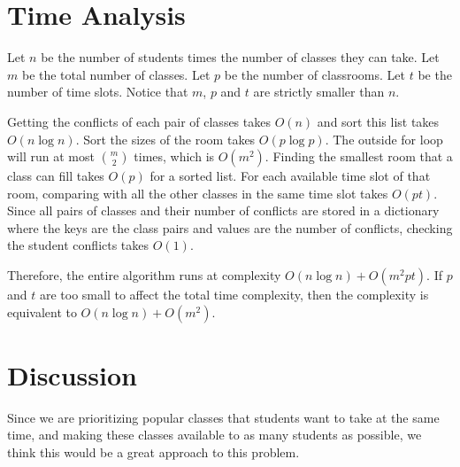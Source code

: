 \documentclass[11pt, oneside]{article}   	%
\begin{document}
\begin{algorithm}[H]

\end{algorithm}
\section{Time Analysis}
Let $n$ be the number of students times the number of classes they can take. Let $m$ be the total number of classes. Let $p$ be the number of classrooms. Let $t$ be the number of time slots. Notice that $m$, $p$ and $t$ are strictly smaller than $n$.

Getting the conflicts of each pair of classes takes $O(n)$ and sort this list takes $O(n\log n)$. Sort the sizes of the room takes $O(p \log p)$. The outside for loop will run at most $m \choose 2$ times, which is $O(m^2)$. Finding the smallest room that a class can fill takes $O(p)$ for a sorted list. For each available time slot of that room, comparing with all the other classes in the same time slot takes $O(pt)$. Since all pairs of classes and their number of conflicts are stored in a dictionary where the keys are the class pairs and values are the number of conflicts, checking the student conflicts takes $O(1)$.

Therefore, the entire algorithm runs at complexity $O(n \log n)+O(m^2pt)$. If $p$ and $t$ are too small to affect the total time complexity, then the complexity is equivalent to $O(n \log n)+O(m^2)$.

\section{Discussion}
Since we are prioritizing popular classes that students want to take at the same time, and making these classes available to as many students as possible, we think this would be a great approach to this problem.
\end{document}
